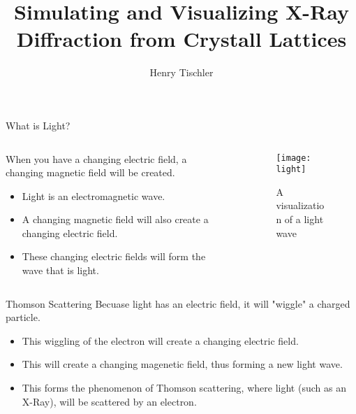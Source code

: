 \documentclass[aspectratio=169]{beamer}
\title {Simulating and Visualizing X-Ray Diffraction from Crystall Lattices}
\author{Henry Tischler}
\institute[Institute of Computing in Research]
\begin{document}
\titlepage


\begin {frame}{What is Light?}
\begin{columns}
				
	\begin{column}[b]{.5\textwidth}
		When you have a changing electric field, a changing magnetic field will be created.
		\begin{itemize}
			\item Light is an electromagnetic wave.
			\item A changing magnetic field will also create a changing electric field.
			\item These changing electric fields will form the wave that is light.
		\end{itemize}		
	\end{column}\
				
	\begin{column}{.5\textwidth}
		\begin{figure}
			\texttt{[image: light]}
			\caption{A visualization of a light wave}
		\end{figure}
	\end{column}
				
\end{columns}
\end{frame}

\begin{frame}[t]{Thomson Scattering}
  Becuase light has an electric field, it will "wiggle" a charged particle.
	\begin{itemize}
		\item This wiggling of the electron will create a changing electric field.
		\item This will create a changing magenetic field, thus forming a new light wave. 
		\item This forms the phenomenon of Thomson scattering, where light (such as an X-Ray), will be scattered by an electron.
	\end{itemize}
				
\end{frame}
\end{document}
